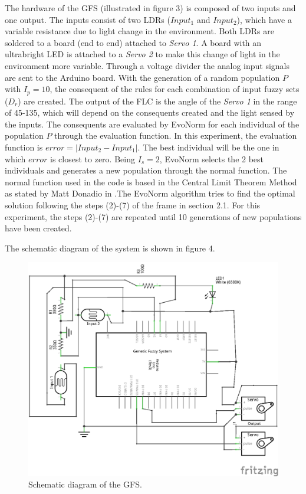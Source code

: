\documentclass{sig-alternate-05-2015}
\begin{document}
The hardware of the GFS (illustrated in figure 3) is composed of two inputs and one output. The inputs consist of two LDRs ($Input_1$ and $Input_2$), which have a variable resistance due to light change in the environment. Both LDRs are soldered to a board (end to end) attached to \textit{Servo 1}. A board with an ultrabright LED is attached to a \textit{Servo 2} to make this change of light in the environment more variable. Through a voltage divider the analog input signals are sent to the Arduino board. With the generation of a random population $P$ with $I_p=10$, the consequent of the rules for each combination of input fuzzy sets ($D_r$) are created. The output of the FLC is the angle of the \textit{Servo 1} in the range of 45-135\degree, which will depend on the consequents created and the light sensed by the inputs. The consequents are evaluated by EvoNorm for each individual of the population $P$ through the evaluation function. In this experiment, the evaluation function is $error=|Input_2-Input_1|$. The best individual will be the one in which $error$ is closest to zero. Being $I_s=2$, EvoNorm selects the 2 best individuals and generates a new population through the normal function. The normal function used in the code is based in the Central Limit Theorem Method as stated by Matt Donadio in \cite{donadio:nf}.The EvoNorm algorithm tries to find the optimal solution following the steps (2)-(7) of the frame in section 2.1. For this experiment, the steps (2)-(7) are repeated until 10 generations of new populations have been created.

The schematic diagram of the system is shown in figure 4.

\begin{figure}[h]
\centering
\includegraphics [scale=0.75]{gfsschem}
\caption{Schematic diagram of the GFS.}
\end{figure}
\end{document}
